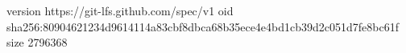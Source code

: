 version https://git-lfs.github.com/spec/v1
oid sha256:80904621234d9614114a83cbf8dbca68b35ece4e4bd1cb39d2c051d7fe8bc61f
size 2796368
